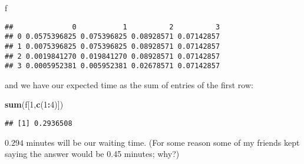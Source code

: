 \documentclass[]{article}
\newenvironment{Shaded}{\begin{snugshade}}{\end{snugshade}}
\newcommand{\DecValTok}[1]{\textcolor[rgb]{0.00,0.00,0.81}{#1}}
\newcommand{\KeywordTok}[1]{\textcolor[rgb]{0.13,0.29,0.53}{\textbf{#1}}}
\newcommand{\NormalTok}[1]{#1}
\newcommand{\OperatorTok}[1]{\textcolor[rgb]{0.81,0.36,0.00}{\textbf{#1}}}
\begin{document}
\begin{Shaded}
\begin{Highlighting}[]
\NormalTok{f}
\end{Highlighting}
\end{Shaded}

\begin{verbatim}
##              0           1          2          3
## 0 0.0575396825 0.075396825 0.08928571 0.07142857
## 1 0.0075396825 0.075396825 0.08928571 0.07142857
## 2 0.0019841270 0.019841270 0.08928571 0.07142857
## 3 0.0005952381 0.005952381 0.02678571 0.07142857
\end{verbatim}

and we have our expected time as the sum of entries of the first row:

\begin{Shaded}
\begin{Highlighting}[]
\KeywordTok{sum}\NormalTok{(f[}\DecValTok{1}\NormalTok{,}\KeywordTok{c}\NormalTok{(}\DecValTok{1}\OperatorTok{:}\DecValTok{4}\NormalTok{)])}
\end{Highlighting}
\end{Shaded}

\begin{verbatim}
## [1] 0.2936508
\end{verbatim}

\(0.294\) minutes will be our waiting time. (For some reason some of my
friends kept saying the answer would be 0.45 minutes; why?)
\end{document}
